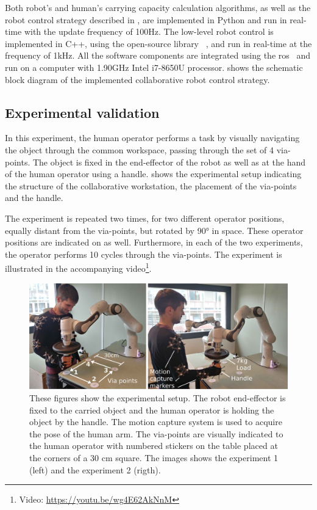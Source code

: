 Both robot's and human's carrying capacity calculation algorithms, as well as the robot control strategy described in , are implemented in Python and run in real-time with the update frequency of 100Hz. The low-level robot control is implemented in C++, using the open-source library ~\cite{pinocchio2021}, and run in real-time at the frequency of 1kHz. All the software components are integrated using the \gls{ros}~\cite{ros} and run on a computer with 1.90GHz Intel i7-8650U processor. 
 shows the schematic block diagram of the implemented collaborative robot control strategy. 

\subsection{Experimental validation}
\label{sec:human_robot_experiment}

In this experiment, the human operator performs a task by {visually} navigating the object through the common workspace, passing through {the set of} 4 via-points. The object is fixed in the end-effector of the robot as well as at the hand of the human operator using a handle.  shows the experimental setup indicating the structure of the collaborative workstation, the placement of the via-points and the handle. 

The experiment is repeated two times, for two different operator positions, equally distant from the via-points, but rotated by 90° in space. These operator positions are indicated on  as well. Furthermore, in each of the two experiments, the operator performs 10 cycles through the via-points. The experiment is illustrated in the accompanying video\footnote{Video: \url{https://youtu.be/wg4E62AkNnM}}.


\begin{figure}[!t]
    \centering
    \includegraphics[width=\linewidth]{Papers/images/both_pose_explanation.jpg}
    \caption{{These figures show the experimental setup. The robot end-effector is fixed to the carried object and the human operator is holding the object by the handle. The motion capture system is used to acquire the pose of the human arm. The via-points are visually indicated to the human operator with numbered stickers on the table placed at the corners of a 30 cm square. The images shows the experiment 1 (left) and the experiment 2 (rigth).}}
    \label{fig:experiment2}
\end{figure}



